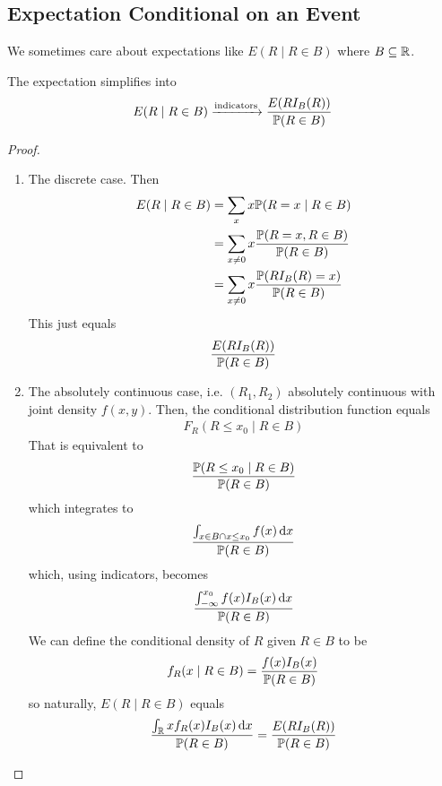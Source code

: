 \subsection{Expectation Conditional on an Event}
We sometimes care about expectations like $E(R \mid R \in B)$ where $B \subseteq \mathbb{R}$.
\begin{proposition}
    The expectation simplifies into
    \begin{align}
        E(R \mid R \in B) \ce{->[indicators]} \frac{E(R I_B(R))}{\probability(R \in B)}
    \end{align}
\end{proposition}
\begin{proof}
    \begin{enumerate}
        \item The discrete case. Then
            \begin{align}
                E(R \mid R \in B) &= \sum_x x \mathbb{P}(R = x \mid R \in B)\\
                &= \sum_{x \ne 0} x \frac{\mathbb{P}(R = x, R \in B)}{\mathbb{P}(R \in B)}\\
                &= \sum_{x \ne 0} x \frac{\mathbb{P}\qty(R I_B(R) = x)}{\mathbb{P}(R \in B)}
            \end{align}
            This just equals $$\frac{E(R I_B(R))}{\mathbb{P}(R \in B)}$$
        \item The absolutely continuous case, i.e. $(R_1,R_2)$ absolutely continuous with joint density $f(x,y)$. Then, the conditional distribution function equals
            \begin{align}
                F_R(R \le x_0 \mid R \in B)
            \end{align}
            That is equivalent to
            \begin{align}
                \frac{\mathbb{P}(R \le x_0 \mid R \in B)}{\mathbb{P}(R \in B)}
            \end{align}
            which integrates to
            \begin{align}
                \frac{\int_{x \in B \cap x \le x_0} f(x) \dd{x}}{\mathbb{P}(R \in B)}
            \end{align}
            which, using indicators, becomes
            \begin{align}
                \frac{\int_{-\infty}^{x_0} f(x) I_B(x) \dd{x}}{\mathbb{P}(R \in B)}
            \end{align}
            We can define the conditional density of $R$ given $R \in B$ to be
            \begin{align}
                f_R(x \mid R \in B) = \frac{f(x) I_B(x)}{\mathbb{P}(R \in B)}
            \end{align}
            so naturally, $E(R \mid R \in B)$ equals
            \begin{align}
                \frac{\int_{\mathbb{R}} x f_R(x) I_B(x) \dd{x}}{\mathbb{P}(R \in B)} = \frac{E(RI_B(R))}{\mathbb{P}(R \in B)}
            \end{align}
    \end{enumerate}
\end{proof}
